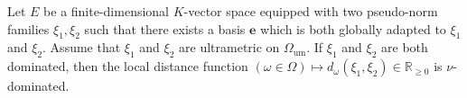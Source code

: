 \documentclass [11pt,reqno]{amsart}
\def\bR{{\mathbb{R}}}
\newcommand{\1}{\mathmybb{1}}
\def\um{\operatorname{um}}
\begin{document}

\begin{proposition}
\label{cor:CM_4.1.8}
Let $E$ be a finite-dimensional $K$-vector space equipped with two pseudo-norm families $\xi_1,\xi_2$ such that there exists a basis $\mathbf{e}$ which is both globally adapted to $\xi_1$ and $\xi_2$. Assume that $\xi_1$ and $\xi_2$ are ultrametric on $\Omega_{\um}$. If $\xi_1$ and $\xi_2$ are both dominated, then the local distance function $(\omega\in\Omega)\mapsto d_{\omega}(\xi_1,\xi_2)\in\bR_{\geq 0}$ is $\nu$-dominated.
\end{proposition}

\end{document}
